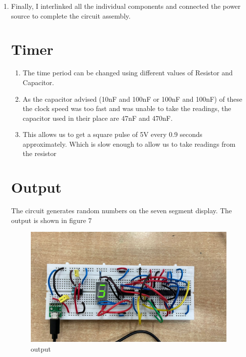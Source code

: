 \documentclass[journal,12pt,twocolumn]{IEEEtran}
\begin{document}
\begin{enumerate}
	\item Finally, I interlinked all the individual components and connected the power source to complete the circuit assembly.
\section{Timer}
\begin{enumerate}
\item The time period can be changed using different values of Resistor and Capacitor.
\item As the capacitor advised (10nF and 100nF or 100nF and 100nF) of these the clock speed was too fast and was unable to take the readings, the capacitor
used in their place are 47nF and 470nF.
\item This allows us to get a square pulse of 5V every 0.9 seconds approximately. Which is slow enough to
allow us to take readings from the resistor	
\end{enumerate}	
\section{Output} 
	The circuit generates random numbers on the seven segment display. The output is shown in figure 7
	\begin{figure}[h]
	\begin{center}
		\includegraphics[width = 1\textwidth]{images/fig.jpeg}
		\caption{output}
		\label{final}
		\end{center}
	\end{figure} \\

\end{enumerate}
\end{document}
